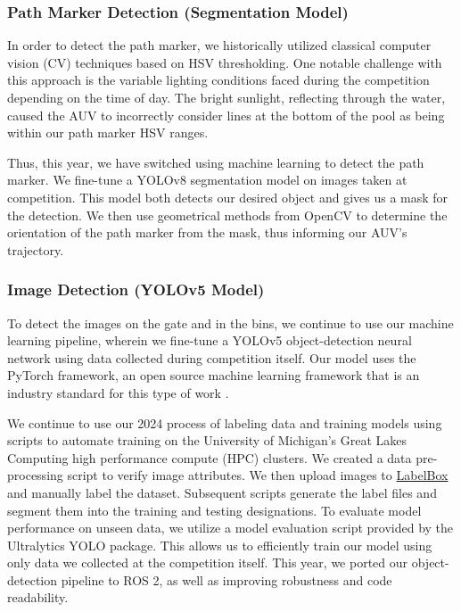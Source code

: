 \documentclass[conference]{IEEEtran}
\begin{document}
\subsubsection{Path Marker Detection (Segmentation Model)}
\label{sssec:cv}
In order to detect the path marker, we historically utilized classical computer vision (CV) techniques based on HSV thresholding. One notable challenge with this approach is the variable lighting conditions faced during the competition depending on the time of day. The bright sunlight, reflecting through the water, caused the AUV to incorrectly consider lines at the bottom of the pool as being within our path marker HSV ranges.

Thus, this year, we have switched using machine learning to detect the path marker. We fine-tune a YOLOv8 segmentation model \cite{b7} on images taken at competition. This model both detects our desired object and gives us a mask for the detection. We then use geometrical methods from OpenCV \cite{b8} to determine the orientation of the path marker from the mask, thus informing our AUV's trajectory.

\subsubsection{Image Detection (YOLOv5 Model)}
\label{sssec:ml_flow}
To detect the images on the gate and in the bins, we continue to use our machine learning pipeline, wherein we fine-tune a YOLOv5 object-detection neural network \cite{b3} using data collected during competition itself. Our model uses the PyTorch framework, an open source machine learning framework that is an industry standard for this type of work \cite{b4}.

We continue to use our 2024 process of labeling data and training models using scripts to automate training on the University of Michigan's Great Lakes Computing high performance compute (HPC) clusters. We created a data pre-processing script to verify image attributes. We then upload images to \href{https://labelbox.com/}{LabelBox} and manually label the dataset. Subsequent scripts generate the label files and segment them into the training and testing designations. To evaluate model performance on unseen data, we utilize a model evaluation script provided by the Ultralytics YOLO package. This allows us to efficiently train our model using only data we collected at the competition itself. This year, we ported our object-detection pipeline to ROS 2, as well as improving robustness and code readability.
\end{document}
